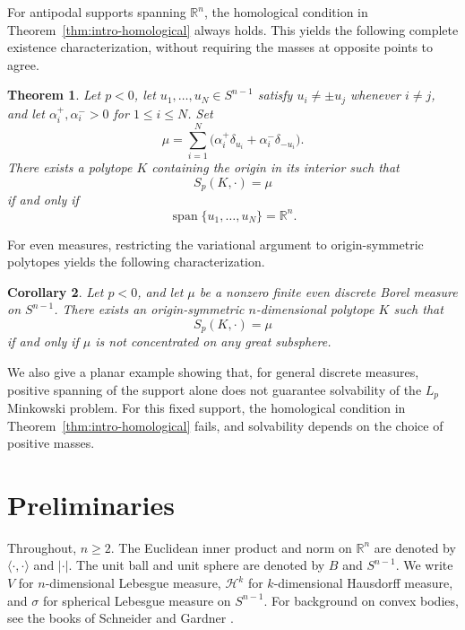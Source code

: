 \documentclass[12pt,reqno]{amsart}
\numberwithin{equation}{section}
\newtheorem{theorem}{Theorem}[section]
\newtheorem{corollary}[theorem]{Corollary}
\theoremstyle{remark}
\DeclareMathOperator{\spanop}{span}
\newcommand{\R}{\mathbb R}
\newcommand{\Haus}{\mathcal H}
\begin{document}
For antipodal supports spanning $\R^n$, the homological condition
in Theorem~\ref{thm:intro-homological} always holds.
This yields the following complete existence characterization,
without requiring the masses at opposite points to agree.

\begin{theorem}\label{thm:intro-antipodal}
	Let \(p<0\), let \(u_1,\ldots,u_N\in S^{n-1}\) satisfy
	\(u_i\neq\pm u_j\) whenever \(i\neq j\), and let
	\(\alpha_i^+,\alpha_i^->0\) for \(1\leq i\leq N\). Set
	\[
	\mu
	=
	\sum_{i=1}^N
	\bigl(\alpha_i^+\delta_{u_i}+\alpha_i^-\delta_{-u_i}\bigr).
	\]
	There exists a polytope \(K\) containing the origin in its
	interior such that
	\begin{equation}\label{eq:intro-antipodal-target}
		S_p(K,\cdot)=\mu
	\end{equation}
	if and only if
	\begin{equation}\label{eq:intro-spanning-condition}
		\spanop\{u_1,\ldots,u_N\}=\R^n.
	\end{equation}
\end{theorem}

For even measures, restricting the variational argument to
origin-symmetric polytopes yields the following characterization.

\begin{corollary}\label{cor:intro-even}
	Let \(p<0\), and let \(\mu\) be a nonzero finite even discrete
	Borel measure on \(S^{n-1}\). There exists an origin-symmetric $n$-dimensional polytope
	\(K\) such that
	\begin{equation}\label{eq:intro-even-target}
		S_p(K,\cdot)=\mu
	\end{equation}
	if and only if \(\mu\) is not concentrated on any great subsphere.
\end{corollary}

We also give a planar example showing that, for general discrete
measures, positive spanning of the support alone does not guarantee
solvability of the $L_p$ Minkowski problem. For this fixed support,
the homological condition in Theorem~\ref{thm:intro-homological}
fails, and solvability depends on the choice of positive masses.


\section{Preliminaries}\label{sec:preliminaries}

 Throughout, $n\geq2$.
The Euclidean inner product and norm on $\R^n$ are denoted by
$\langle\cdot,\cdot\rangle$ and $|\cdot|$.
The unit ball and unit sphere are denoted by $B$ and $S^{n-1}$.
We write $V$ for $n$-dimensional Lebesgue measure, $\Haus^k$
for $k$-dimensional Hausdorff measure, and $\sigma$ for spherical
Lebesgue measure on $S^{n-1}$. For background on convex bodies, see the books of
Schneider \cite{Schneider} and Gardner \cite{Gaedner gtbook}.
\end{document}
